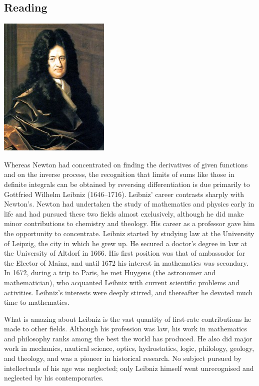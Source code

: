 


\subsection*{Reading}
\begin{center}
  \includegraphics[height=0.2\textheight]{leibniz}
\end{center}

Whereas Newton had concentrated on finding the derivatives of given functions and on the inverse process, the recognition
that limits of sums like those in definite integrals can be obtained by reversing differentiation is due primarily to
Gottfried Wilhelm Leibniz (1646--1716). Leibniz' career contrasts sharply with Newton's. Newton had undertaken the study
of mathematics and physics early in life and had pursued these two fields almost exclusively, although he did make minor
contributions to chemistry and theology. His career as a professor gave him the opportunity to concentrate. Leibniz started
by studying law at the University of Leipzig, the city in which he grew up. He secured a doctor's degree in law at the
University of Altdorf in 1666. His first position was that of ambassador for the Elector of Mainz, and until 1672 his interest
in mathematics was secondary. In 1672, during a trip to Paris, he met Huygens (the astronomer and mathematician), who acquanted
Leibniz with current scientific problems and activities. Leibniz's interests were deeply stirred, and thereafter he devoted
much time to mathematics.

What is amazing about Leibniz is the vast quantity of first-rate contributions he made to other fields. Although his profession
was law, his work in mathematics and philosophy ranks among the best the world has produced. He also did major work in mechanics,
nautical science, optics, hydrostatics, logic, philology, geology, and theology, and was a pioneer in historical research. No
subject pursued by intellectuals of his age was neglected; only Leibniz himself went unrecognised and neglected by his contemporaries.

